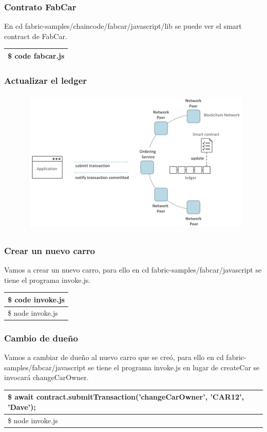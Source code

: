 \documentclass{beamer}
\begin{document}
	\begin{frame}
		\frametitle{Contrato FabCar}
		En cd fabric-samples/chaincode/fabcar/javascript/lib se puede ver el smart contract de FabCar.
		\begin{center}
			\begin{tabulary}{\linewidth}{L}
				\hline
				\$ code fabcar.js \\
				\hline
			\end{tabulary} 
		\end{center}
	\end{frame}
	
	\begin{frame}
		\frametitle{Actualizar el ledger}
		\begin{figure}[h]
			\includegraphics[scale=.4]{app_04}
			\centering
		\end{figure}
	\end{frame}

	\begin{frame}
		\frametitle{Crear un nuevo carro}
		Vamos a crear un nuevo carro, para ello en cd fabric-samples/fabcar/javascript se tiene el programa invoke.js.
		\begin{center}
			\begin{tabulary}{\linewidth}{L}
				\hline
				\$ code invoke.js \\
				\hline
				\$ node invoke.js \\
				\hline
			\end{tabulary} 
		\end{center}
	\end{frame}
	
	\begin{frame}
		\frametitle{Cambio de dueño}
		Vamos a cambiar de dueño al nuevo carro que se creó, para ello en cd fabric-samples/fabcar/javascript se tiene el programa invoke.js en lugar de createCar se invocará changeCarOwner.
		\begin{center}
			\begin{tabulary}{\linewidth}{L}
				\hline
				\$ await contract.submitTransaction('changeCarOwner', 'CAR12', 'Dave'); \\
				\hline
				\$ node invoke.js \\
				\hline
			\end{tabulary} 
		\end{center}
	\end{frame}
	
\end{document}
